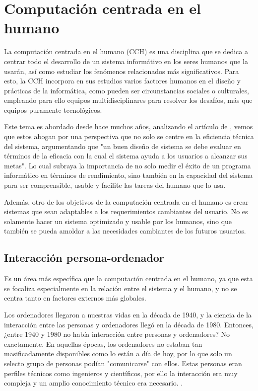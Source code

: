 \section{Computación centrada en el humano}

La computación centrada en el humano (CCH) es una disciplina que se dedica a  centrar todo el desarrollo de un sistema informátivo en los seres humanos que la usarán, así como estudiar los fenómenos relacionados más significativos. Para esto, la CCH incorpora en sus estudios varios factores humanos en el diseño y prácticas de la informática, como pueden ser circunstancias sociales o culturales, empleando para ello equipos multidisciplinares para resolver los desafíos, más que equipos puramente tecnológicos.

Este tema es abordado desde hace muchos años, analizando el artículo de \cite{Card1983ThePO}, vemos que estos abogan por una perspectiva que no solo se centre en la eficiencia técnica del sistema, argumentando que "un buen diseño de sistema se debe evaluar en términos de la eficacia con la cual el sistema ayuda a los usuarios a alcanzar sus metas". Lo cual subraya la importancia de no solo medir el éxito de un programa informático en términos de rendimiento, sino también en la capacidad del sistema para ser comprensible, usable y facilite las tareas del humano que lo usa.

Además, otro de los objetivos de la computación centrada en el humano es crear sistemas que sean adaptables a los requerimientos cambiantes del usuario. No es solamente hacer un sistema optimizado y usable por los humanos, sino que también se pueda amoldar a las necesidades cambiantes de los futuros usuarios.

\subsection{Interacción persona-ordenador }

Es un área más específica que la computación centrada en el humano, ya que esta se focaliza especialmente en la relación entre el sistema y el humano, y no se centra tanto en factores externos más globales.

Los ordenadores llegaron a nuestras vidas en la década de 1940, y la ciencia de la interacción entre las personas y ordenadores llegó en la década de 1980. Entonces, ¿entre 1940 y 1980 no había interacción entre personas y ordenadores? No exactamente. En aquellas épocas, los ordenadores no estaban tan masificadamente disponibles como lo están a día de hoy, por lo que solo un selecto grupo de personas podían "comunicarse" con ellos. Estas personas eran perfiles técnicos como ingenieros y científicos, por ello la interacción era muy compleja y un amplio conocimiento técnico era necesario. \citep{mackenzie2012human}.

